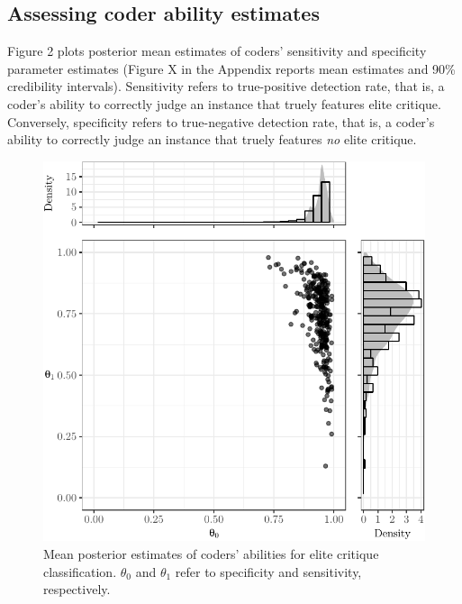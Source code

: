 \documentclass[12pt,]{article}
\begin{document}
\hypertarget{assessing-coder-ability-estimates}{%
\subsection{Assessing coder ability
estimates}\label{assessing-coder-ability-estimates}}

Figure 2 plots posterior mean estimates of coders' sensitivity and
specificity parameter estimates (Figure X in the Appendix reports mean
estimates and 90\% credibility intervals). Sensitivity refers to
true-positive detection rate, that is, a coder's ability to correctly
judge an instance that truely features elite critique. Conversely,
specificity refers to true-negative detection rate, that is, a coder's
ability to correctly judge an instance that truely features \emph{no}
elite critique.

\begin{figure}[H]

{\centering \includegraphics{licht_2019_evaluating_crowdsourced_elite_critique_codings_files/figure-latex/thetas_ae_scatter-1} 

}

\caption{Mean posterior estimates of coders' abilities for elite critique classification. $\theta_0$ and $\theta_1$ refer to specificity  and sensitivity, respectively.}\label{fig:thetas_ae_scatter}
\end{figure}
\end{document}
